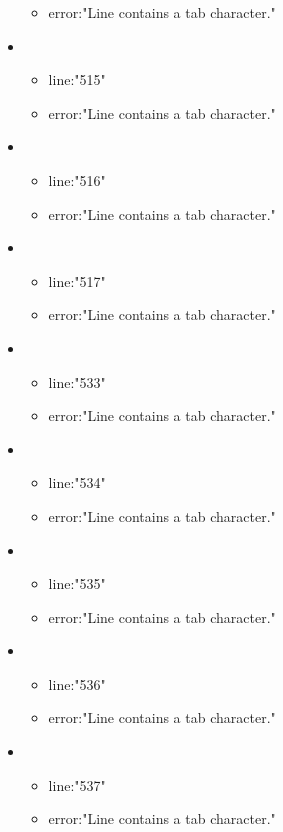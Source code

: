 \begin{itemize}
\begin{itemize}
		\item error:"Line contains a tab character." 
	\end{itemize}
	\item 
	\begin{itemize} 
		\item line:"515" 
		\item error:"Line contains a tab character." 
	\end{itemize}
	\item 
	\begin{itemize} 
		\item line:"516" 
		\item error:"Line contains a tab character." 
	\end{itemize}
	\item 
	\begin{itemize} 
		\item line:"517" 
		\item error:"Line contains a tab character." 
	\end{itemize}
	\item 
	\begin{itemize} 
		\item line:"533" 
		\item error:"Line contains a tab character." 
	\end{itemize}
	\item 
	\begin{itemize} 
		\item line:"534" 
		\item error:"Line contains a tab character." 
	\end{itemize}
	\item 
	\begin{itemize} 
		\item line:"535" 
		\item error:"Line contains a tab character." 
	\end{itemize}
	\item 
	\begin{itemize} 
		\item line:"536" 
		\item error:"Line contains a tab character." 
	\end{itemize}
	\item 
	\begin{itemize} 
		\item line:"537" 
		\item error:"Line contains a tab character." 
	\end{itemize}

\end{itemize}
